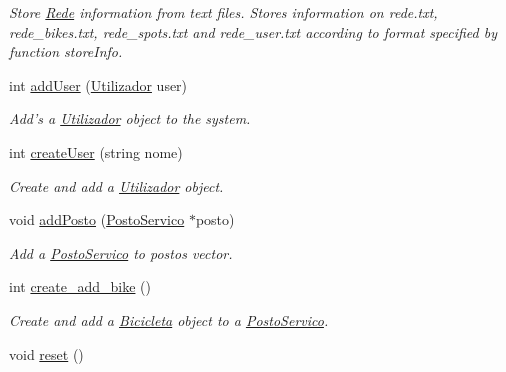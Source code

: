 \begin{DoxyCompactItemize}
\begin{DoxyCompactList}\small\item\em Store \hyperlink{class_rede}{Rede} information from text files. Stores information on rede.\+txt, rede\+\_\+bikes.\+txt, rede\+\_\+spots.\+txt and rede\+\_\+user.\+txt according to format specified by function store\+Info. \end{DoxyCompactList}\item 
int \hyperlink{class_rede_ae78851a9d7efe2a9e0d2ead64f68ef73}{add\+User} (\hyperlink{class_utilizador}{Utilizador} user)
\begin{DoxyCompactList}\small\item\em Add's a \hyperlink{class_utilizador}{Utilizador} object to the system. \end{DoxyCompactList}\item 
int \hyperlink{class_rede_a39d746dc37d11b8c870701a3afa9328e}{create\+User} (string nome)
\begin{DoxyCompactList}\small\item\em Create and add a \hyperlink{class_utilizador}{Utilizador} object. \end{DoxyCompactList}\item 
\hypertarget{class_rede_a00b09749f19ec7535127e75531281511}{void \hyperlink{class_rede_a00b09749f19ec7535127e75531281511}{add\+Posto} (\hyperlink{class_posto_servico}{Posto\+Servico} $\ast$posto)}\label{class_rede_a00b09749f19ec7535127e75531281511}

\begin{DoxyCompactList}\small\item\em Add a \hyperlink{class_posto_servico}{Posto\+Servico} to postos vector. \end{DoxyCompactList}\item 
int \hyperlink{class_rede_a4177da39d4aa05cd0451d52a7220b7c5}{create\+\_\+add\+\_\+bike} ()
\begin{DoxyCompactList}\small\item\em Create and add a \hyperlink{class_bicicleta}{Bicicleta} object to a \hyperlink{class_posto_servico}{Posto\+Servico}. \end{DoxyCompactList}\item 
\hypertarget{class_rede_adec8c4515163174c0fab8068e36c6cc5}{void \hyperlink{class_rede_adec8c4515163174c0fab8068e36c6cc5}{reset} ()}\label{class_rede_adec8c4515163174c0fab8068e36c6cc5}


\end{DoxyCompactItemize}
